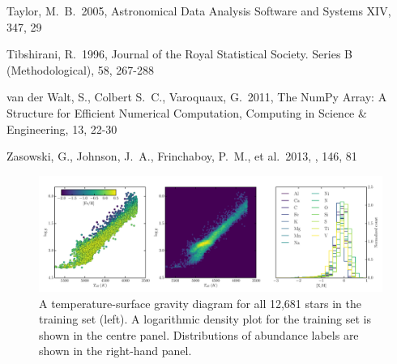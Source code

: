 \documentclass[12pt,preprint]{aastex}
\begin{document}
\begin{thebibliography}{dummy}
 Taylor, M.~B.\ 2005, Astronomical Data Analysis Software and Systems XIV, 347, 29 

 Tibshirani, R.\ 1996, Journal of the Royal Statistical Society. Series B (Methodological), 58, 267-288

 van der Walt, S., Colbert S.~C., Varoquaux, G.\ 2011, The NumPy Array: A Structure for Efficient Numerical Computation, Computing in Science \& Engineering, 13, 22-30

 Zasowski, G., Johnson, 
J.~A., Frinchaboy, P.~M., et al.\ 2013, \aj, 146, 81 


\end{thebibliography}

\clearpage

\begin{figure}[p]
\centering
\includegraphics[width=\textwidth]{training_set_hrd.pdf}
\caption{A temperature-surface gravity diagram for all 12,681 stars in
the training set (left). A logarithmic density plot for the training set
is shown in the centre panel. Distributions of abundance labels
are shown in the right-hand panel.\label{fig:training_set_hrd}}
\end{figure}

\clearpage
\end{document}
